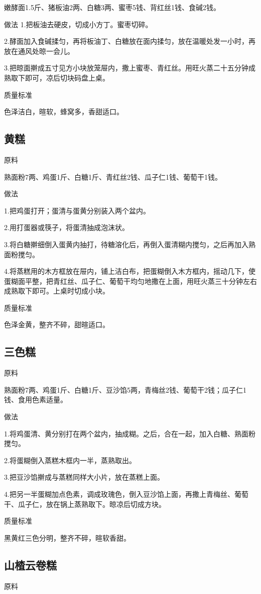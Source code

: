 \documentclass{ctexbook}
\begin{document}
嫩酵面1.5斤、猪板油2两、白糖3两、蜜枣5钱、背红丝1钱、食碱2钱。

做法
1.把板油去硬皮，切成小方丁。蜜枣切碎。

2.酵面加入食碱揉匀，再将板油丁、白糖放在面内揉匀，放在温暖处发一小时，再放在通风处晾一会儿。

3.把晾面擀成五寸见方小块放笼屉内，撒上蜜枣、青红丝。用旺火蒸二十五分钟成熟取下即可，凉后切块码盘上桌。

质量标准

色泽洁白，暄软，蜂窝多，香甜适口。
\subsection{黄糕}
原料

熟面粉7两、鸡蛋1斤、白糖1斤、青红丝2钱、瓜子仁1钱、葡萄干1钱。

做法

1.把鸡蛋打开；蛋清与蛋黄分别装入两个盆内。

2.用打蛋器或筷子，将蛋清抽成泡沫状。

3.将白糖擀细倒入蛋黄内抽打，待糖溶化后，再倒入蛋清糊内搅匀，之后再加入熟面粉搅匀。

4.将蒸糕用的木方框放在屉内，铺上洁白布，把蛋糊倒入木方框内，摇动几下，使蛋糊面平整，把青红丝、瓜子仁、葡萄干均匀地撒在上面，用旺火蒸三十分钟左右成熟取下即可。上桌时切成小块。

质量标准

色泽金黄，整齐不碎，甜暄适口。
\subsection{三色糕}
原料

熟面粉7两、鸡蛋1斤、白糖1斤、豆沙馅5两，青梅丝2钱、葡萄干2钱；瓜子仁1钱、食用色素适量。

做法

1.将鸡蛋清、黄分别打在两个盆内，抽成糊。之后，合在一起，加入白糖、熟面粉搅匀。

2.将蛋糊倒入蒸糕木框内一半，蒸熟取出。

3.把豆沙馅擀成与蒸糕同样大小片，放在蒸糕上面。

4.把另一半蛋糊加点色素，调成玫瑰色，倒入豆沙馅上面，再撒上青梅丝、葡萄干、瓜子仁，放在锅上蒸熟取下。晾凉后切成方块。

质量标准

黑黄红三色分明，整齐不碎，暄软香甜。
\subsection{山楂云卷糕}
原料
\end{document}
